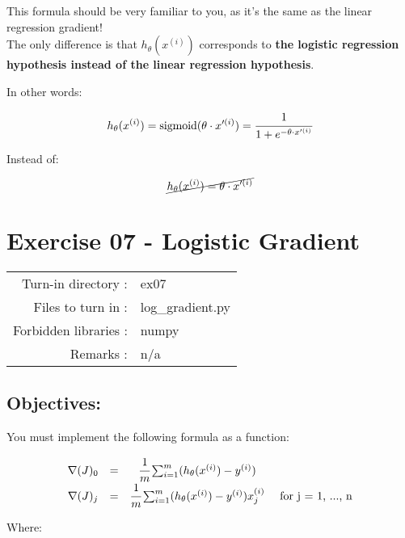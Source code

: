 \documentclass[]{article}
\begin{document}
This formula should be very familiar to you, as it's the same as the
linear regression gradient!\\
The only difference is that \(h_{\theta}(x^{(i)})\) corresponds to
\textbf{the logistic regression hypothesis instead of the linear
regression hypothesis}.

In other words:

\large

\[
h_{\theta}(x^{(i)}) = \text{sigmoid}( \theta \cdot x'^{(i)}) = \cfrac{1} {1 + e^{-\theta \cdot x'^{(i)}}}
\] \normalsize

Instead of:

\large

\[
\cancel{h_{\theta}(x^{(i)}) = \theta \cdot x'^{(i)}}
\] \normalsize \clearpage

\hypertarget{exercise-07---logistic-gradient-1}{%
\section{Exercise 07 - Logistic
Gradient}\label{exercise-07---logistic-gradient-1}}

\begin{longtable}[]{@{}rl@{}}
\toprule
\endhead
Turn-in directory : & ex07\tabularnewline
Files to turn in : & log\_gradient.py\tabularnewline
Forbidden libraries : & numpy\tabularnewline
Remarks : & n/a\tabularnewline
\bottomrule
\end{longtable}

\hypertarget{objectives-6}{%
\subsection{Objectives:}\label{objectives-6}}

You must implement the following formula as a function:

\large

\[
\begin{matrix}
\nabla(J)_0 &  = &\cfrac{1}{m}\sum_{i=1}^{m}(h_{\theta}(x^{(i)}) - y^{(i)}) & \\
\nabla(J)_j & = &\cfrac{1}{m}\sum_{i=1}^{m}(h_{\theta}(x^{(i)}) - y^{(i)})x_{j}^{(i)} & \text{ for j = 1, ..., n}    
\end{matrix}
\] \normalsize

Where:
\end{document}

